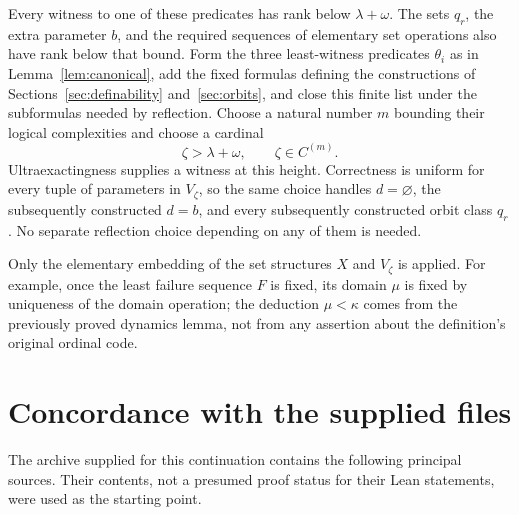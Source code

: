 \documentclass[11pt,letterpaper]{article}
\theoremstyle{definition}
\begin{document}
Every witness to one of these predicates has rank below $\lambda+\omega$. The sets $q_r$, the extra parameter $b$, and the required sequences of elementary set operations also have rank below that bound. Form the three least-witness predicates $\theta_i$ as in Lemma~\ref{lem:canonical}, add the fixed formulas defining the constructions of Sections~\ref{sec:definability} and~\ref{sec:orbits}, and close this finite list under the subformulas needed by reflection. Choose a natural number $m$ bounding their logical complexities and choose a cardinal
\[
                              \zeta>\lambda+\omega,\qquad
                              \zeta\in C^{(m)}.
\]
Ultraexactingness supplies a witness at this height. Correctness is uniform for every tuple of parameters in $V_\zeta$, so the same choice handles $d=\varnothing$, the subsequently constructed $d=b$, and every subsequently constructed orbit class $q_r$. No separate reflection choice depending on any of them is needed.

Only the elementary embedding of the set structures $X$ and $V_\zeta$ is applied. For example, once the least failure sequence $F$ is fixed, its domain $\mu$ is fixed by uniqueness of the domain operation; the deduction $\mu<\kappa$ comes from the previously proved dynamics lemma, not from any assertion about the definition's original ordinal code.

\section{Concordance with the supplied files}\label{app:concordance}

The archive supplied for this continuation contains the following principal sources. Their contents, not a presumed proof status for their Lean statements, were used as the starting point.
\end{document}
